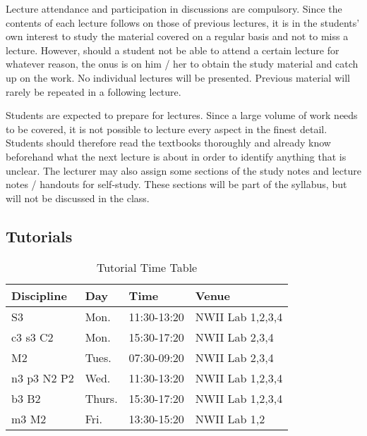         Lecture attendance and participation in discussions are compulsory.
        Since the contents of each lecture follows on those of previous
        lectures, it is in the students’ own interest to study the material
        covered on a regular basis and not to miss a lecture. However, should a
        student not be able to attend a certain lecture for whatever reason,
        the onus is on him / her to obtain the study material and catch up on
        the work. No individual lectures will be presented. Previous material
        will rarely be repeated in a following lecture.

        Students are expected to prepare for lectures. Since a large volume of
        work needs to be covered, it is not possible to lecture every aspect in
        the finest detail. Students should therefore read the textbooks
        thoroughly and already know beforehand what the next lecture is about
        in order to identify anything that is unclear. The lecturer may also
        assign some sections of the study notes and lecture notes / handouts
        for self-study. These sections will be part of the syllabus, but will
        not be discussed in the class.

    \subsection{Tutorials}
        \begin{table}[!h]
            \begin{center}
            \begin{tabular}{|l|l|l|l|}
                \hline
                {\bf Discipline} & {\bf Day} & {\bf Time} & {\bf Venue} \\
                \hline
                S3          & Mon.   & 11:30-13:20 & NWII Lab 1,2,3,4 \\
                c3 s3 C2    & Mon.   & 15:30-17:20 & NWII Lab 2,3,4 \\
                M2          & Tues.  & 07:30-09:20 & NWII Lab 2,3,4 \\
                n3 p3 N2 P2 & Wed.   & 11:30-13:20 & NWII Lab 1,2,3,4 \\
                b3 B2       & Thurs. & 15:30-17:20 & NWII Lab 1,2,3,4 \\
                m3 M2       & Fri.   & 13:30-15:20 & NWII Lab 1,2 \\
                \hline
            \end{tabular}
            \caption{Tutorial Time Table}
            \label{tab:tutorials}
            \end{center}
        \end{table}

